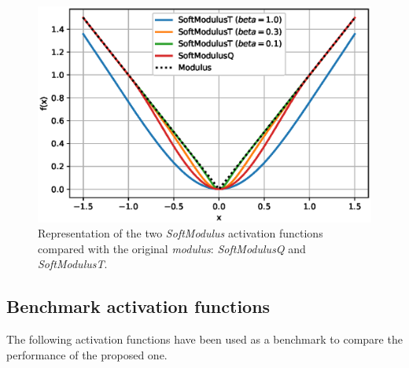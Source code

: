 \begin{figure}[h!]
	\centering
	\includegraphics[width=0.5\linewidth]{modulus/images/activations_smooth}
	\caption{Representation of the two \textit{SoftModulus} activation functions compared with the original \textit{modulus}: \textit{SoftModulusQ} and \textit{SoftModulusT}.}
	\label{fig:activationssmooth}
\end{figure}

\subsection{Benchmark activation functions}
The following activation functions have been used as a benchmark to compare the performance of the proposed one.


